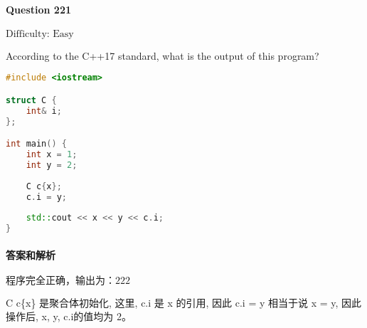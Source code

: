 \documentclass{article}
\begin{document}
	
	\paragraph*{Question 221} $\boxed{\text{Difficulty: Easy}} $			
	
	According to the C++17 standard, what is the output of this program?
	
	\begin{lstlisting}[language=C++]  		
#include <iostream>

struct C {
	int& i;
};

int main() {
	int x = 1;
	int y = 2;
	
	C c{x};
	c.i = y;
	
	std::cout << x << y << c.i;
}
	\end{lstlisting}
	
	
	\paragraph*{答案和解析} $\boxed{\text{程序完全正确，输出为：222}} $
	
	C c\{x\} 是聚合体初始化, 这里, c.i 是 x 的引用, 因此 c.i = y 相当于说 x = y, 因此操作后, x, y, c.i的值均为 2。
	
\end{document}
